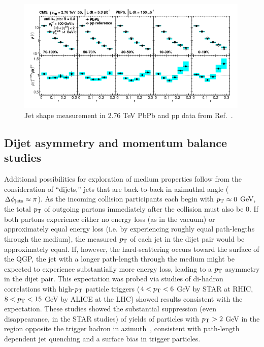 \begin{figure}[hbtp]
\begin{center}
\includegraphics[width=0.99\textwidth]{figures/Theory/CMS_JetShapes.png}
\caption[Jet shape measurement in 2.76 TeV PbPb and pp data]{Jet shape measurement in 2.76 TeV PbPb and pp data from Ref.~\cite{Chatrchyan:2013kwa}.}
\label{fig:cms_jet_shape}
\end{center}
\end{figure}


\clearpage 

\subsection{Dijet asymmetry and momentum balance studies}
\label{sec:dijet_balance}

Additional possibilities for exploration of medium properties follow from the consideration of ``dijets,'' jets that are back-to-back in azimuthal angle ($\Delta \phi_{\rm jets} \approx \pi$).  As the incoming collision participants each begin with $p_{\rm T} \approx 0$ GeV, the total $p_{\rm T}$ of outgoing partons immediately after the collision must also be 0.  If both partons experience either no energy loss (as in the vacuum) or approximately equal energy loss (i.e. by experiencing roughly equal path-lengths through the medium), the measured $p_{\rm T}$ of each jet in the dijet pair would be approximately equal.  If, however, the hard-scattering occurs toward the surface of the QGP, the jet with a longer path-length through the medium might be expected to experience substantially more energy loss, leading to a $p_{\rm T}$ asymmetry in the dijet pair.  This expectation was probed via studies of di-hadron correlations with high-$p_{\rm T}$ particle triggers ($4 < p_{\rm T} < 6$ GeV by STAR at RHIC, $8 < p_{\rm T} < 15 $ GeV by ALICE at the LHC) showed results consistent with the expectation.  These studies showed the substantial suppression (even disappearance, in the STAR studies) of yields of particles with $p_{\rm T} > 2$ GeV in the region opposite the trigger hadron in azimuth~\cite{Adler:2002tq, Aamodt:2011vg}, consistent with path-length dependent jet quenching and a surface bias in trigger particles.  

